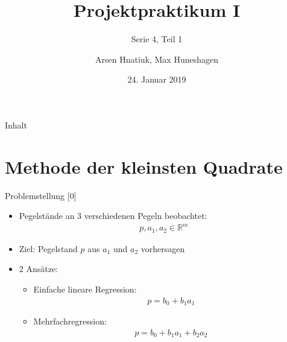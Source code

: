 \documentclass{beamer}
\title{Projektpraktikum I}
\subtitle{Serie 4, Teil 1}
\author{Arsen Hnatiuk, Max Huneshagen}
\date{24. Januar 2019}
\begin{document}
\begin{frame}
  \maketitle
\end{frame}

\begin{frame}{Inhalt}
  \tableofcontents
  

  
 
\end{frame}
 \section{Methode der kleinsten Quadrate}  
\begin{frame}{Problemstellung [0]}
	\begin{itemize}
		\item Pegelstände an 3 verschiedenen Pegeln beobachtet:
		\begin{align}
		p, a_1, a_2 \in \mathbb{R}^m
		\end{align}
		\item Ziel: Pegelstand $p$ aus $a_1$ und $a_2$ vorhersagen
		\pause
		\item 2 Ansätze:
		\begin{itemize}
			\item Einfache lineare Regression:
			\begin{align}
			p =b_0+b_1a_1
			\label{eq:lin_reg}
			\end{align}
			\item Mehrfachregression:
			\begin{align}
			p =b_0+b_1a_1+b_2a_2
			\label{eq:mehr_reg}
			\end{align}
		\end{itemize}
	\end{itemize}
	
\end{frame}
\end{document}
